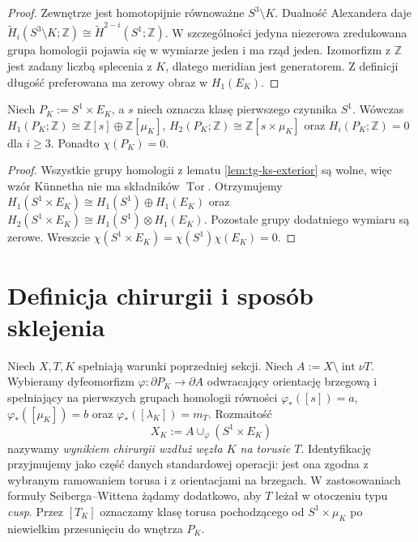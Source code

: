 \begin{proof}
Zewnętrze jest homotopijnie równoważne $S^3\setminus K$.
Dualność Alexandera daje
$\widetilde H_i(S^3\setminus K;\mathbb Z)
\cong\widetilde H^{2-i}(S^1;\mathbb Z)$.
W szczególności jedyna niezerowa zredukowana grupa
homologii pojawia się w wymiarze jeden i ma rząd jeden.
Izomorfizm z $\mathbb Z$ jest zadany liczbą splecenia
z $K$, dlatego meridian jest generatorem. Z definicji
długość preferowana ma zerowy obraz w $H_1(E_K)$.
\end{proof}

\begin{wniosek}
\label{cor:tg-ks-piece}
Niech $P_K:=S^1\times E_K$, a $s$ niech oznacza
klasę pierwszego czynnika $S^1$. Wówczas
$H_1(P_K;\mathbb Z)\cong\mathbb Z[s]\oplus\mathbb Z[\mu_K]$,
$H_2(P_K;\mathbb Z)\cong\mathbb Z[s\times\mu_K]$
oraz $H_i(P_K;\mathbb Z)=0$ dla $i\ge3$.
Ponadto $\chi(P_K)=0$.
\end{wniosek}

\begin{proof}
Wszystkie grupy homologii z lematu
\ref{lem:tg-ks-exterior} są wolne, więc wzór Künnetha
nie ma składników $\operatorname{Tor}$. Otrzymujemy
$H_1(S^1\times E_K)\cong H_1(S^1)\oplus H_1(E_K)$
oraz $H_2(S^1\times E_K)\cong H_1(S^1)\otimes H_1(E_K)$.
Pozostałe grupy dodatniego wymiaru są zerowe.
Wreszcie $\chi(S^1\times E_K)=\chi(S^1)\chi(E_K)=0$.
\end{proof}

\section{Definicja chirurgii i sposób sklejenia}
\label{sec:tg-ks-glue}

\begin{definicja}
\label{def:tg-ks-operation}
Niech $X,T,K$ spełniają warunki poprzedniej sekcji.
Niech $A:=X\setminus\operatorname{int}\nu T$.
Wybieramy dyfeomorfizm $\varphi:\partial P_K\to\partial A$
odwracający orientację brzegową i spełniający na
pierwszych grupach homologii równości
$\varphi_*([s])=a$, $\varphi_*([\mu_K])=b$
oraz $\varphi_*([\lambda_K])=m_T$.
Rozmaitość
\[
X_K:=A\cup_\varphi(S^1\times E_K)
\]
nazywamy \emph{wynikiem chirurgii wzdłuż węzła $K$ na torusie $T$}.
Identyfikację przyjmujemy jako część danych standardowej
operacji: jest ona zgodna z wybranym ramowaniem torusa
i z orientacjami na brzegach. W zastosowaniach
formuły Seiberga--Wittena żądamy dodatkowo, aby $T$
leżał w otoczeniu typu \emph{cusp}. Przez $[T_K]$
oznaczamy klasę torusa pochodzącego od
$S^1\times\mu_K$ po niewielkim przesunięciu do wnętrza $P_K$.
\end{definicja}

